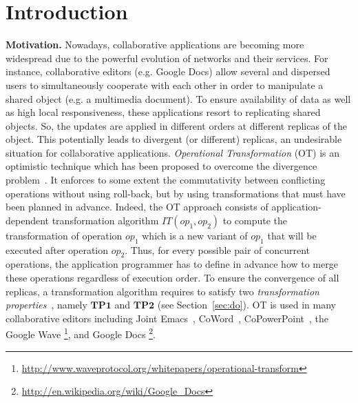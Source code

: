 \documentclass[submission,copyright,creativecommons]{eptcs}
\begin{document}
\section{Introduction}
\noindent\textbf{Motivation.}
Nowadays, collaborative applications are becoming more widespread
due to the powerful evolution of networks and their services. For instance, collaborative editors (e.g. Google Docs) allow several and dispersed users to simultaneously cooperate  with each other in order to manipulate a shared object (e.g. a multimedia document). To ensure availability of data as well as high local responsiveness, these applications resort to replicating shared objects.
So, the updates are applied in different orders
at different replicas of the object. This potentially leads to divergent (or different)
replicas, an undesirable situation for collaborative applications.
\emph{Operational Transformation} (OT) is an optimistic technique which has been proposed to overcome the
divergence problem~\cite{Ellis89,Sun98}. It
enforces to some extent the commutativity between conflicting
operations without using roll-back, but by using transformations that must have been planned in advance.
Indeed, the OT approach consists of application-dependent transformation algorithm $IT(op_1, op_2)$ to compute
the transformation of operation $op_1$  which is a  new variant of $op_1$ that will be executed after operation $op_2$. Thus, for every possible pair of concurrent
operations, the application programmer has to define in advance how to merge these operations regardless of execution
order. 
To ensure the convergence of all replicas, a transformation algorithm requires to   satisfy   two \emph{transformation
properties}~\cite{Ressel.ea:96}, namely $\mathbf{TP1}$ and $\mathbf{TP2}$ (see Section~\ref{sec:do}).
OT is used in many
collaborative editors including Joint Emacs~\cite{Ressel.ea:96}, CoWord~\cite{Sun06}, CoPowerPoint~\cite{Sun06}, the Google Wave \footnote{\url{http://www.waveprotocol.org/whitepapers/operational-transform}}, and Google Docs \footnote{\url{http://en.wikipedia.org/wiki/Google_Docs}}.
\end{document}
